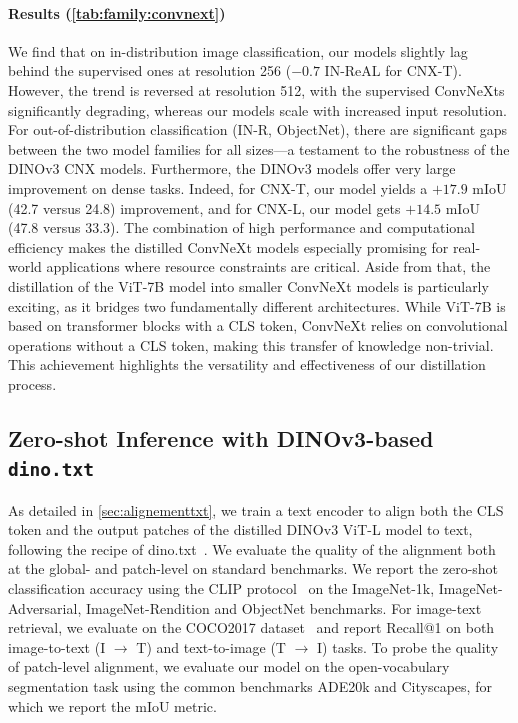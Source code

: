 \paragraph[Results]{Results (\cref{tab:family:convnext})}
We find that on in-distribution image classification, our models slightly lag behind the supervised ones at resolution 256 (\eg $-0.7$ IN-ReAL for CNX-T).
However, the trend is reversed at resolution 512, with the supervised ConvNeXts significantly degrading, whereas our models scale with increased input resolution.
For out-of-distribution classification (IN-R, ObjectNet), there are significant gaps between the two model families for all sizes---a testament to the robustness of the DINOv3 CNX models. 
Furthermore, the DINOv3 models offer very large improvement on dense tasks. 
Indeed, for CNX-T, our model yields a $+17.9$ mIoU (42.7 versus 24.8) improvement, and for CNX-L, our model gets $+14.5$ mIoU (47.8 versus 33.3).
The combination of high performance and computational efficiency makes the distilled ConvNeXt models especially promising for real-world applications where resource constraints are critical.
Aside from that, the distillation of the ViT-7B model into smaller ConvNeXt models is particularly exciting, as it bridges two fundamentally different architectures. 
While ViT-7B is based on transformer blocks with a CLS token, ConvNeXt relies on convolutional operations without a CLS token, making this transfer of knowledge non-trivial. This achievement highlights the versatility and effectiveness of our distillation process. 




\subsection[Zero-shot Inference with DINOv3-based dino.txt]{Zero-shot Inference with DINOv3-based \texttt{dino.txt}}
\label{sec:family:text}

As detailed in \cref{sec:alignementtxt}, we train a text encoder to align both the CLS token and the output patches of the distilled DINOv3 ViT-L model to text, following the recipe of dino.txt~\citet{jose2025dinov2}.
We evaluate the quality of the alignment both at the global- and patch-level on standard benchmarks. 
We report the zero-shot classification accuracy using the CLIP protocol~\citep{radford2021learning} on the ImageNet-1k, ImageNet-Adversarial, ImageNet-Rendition and ObjectNet benchmarks. 
For image-text retrieval, we evaluate on the COCO2017 dataset~\citep{coco2017} and report Recall@1 on both image-to-text (I $\rightarrow$ T) and text-to-image (T $\rightarrow$ I) tasks. 
To probe the quality of patch-level alignment, we evaluate our model on the open-vocabulary segmentation task using the common benchmarks ADE20k and Cityscapes, for which we report the mIoU metric.

